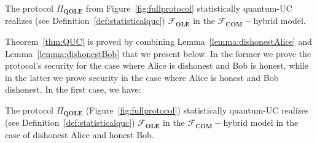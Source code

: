 \begin{theorem}

The protocol $\Pi_{\textbf{QOLE}}$ from Figure~\ref{fig:fullprotocol} statistically quantum-UC realizes  (see Definition~\ref{def:statisticalquc}) $\mathcal{F}_{\textbf{OLE}}$ in the $\mathcal{F}_{\textbf{COM}}-$hybrid model.
\label{thm:QUC}
\end{theorem}

Theorem~\ref{thm:QUC} is proved by combining Lemma~\ref{lemma:dishonestAlice} and Lemma~\ref{lemma:dishonestBob} that we present below.  In the former we prove the protocol's security for the case where Alice is dishonest and Bob is honest, while in the latter we prove security in the case where Alice is honest and Bob dishonest. 
In the first case, we have:

\begin{lemma}
The protocol $\Pi_{\textbf{QOLE}}$ (Figure~\ref{fig:fullprotocol}) statistically quantum-UC realizes  (see Definition~\ref{def:statisticalquc}) $\mathcal{F}_{\textbf{OLE}}$ in the $\mathcal{F}_{\textbf{COM}}-$hybrid model in the case of dishonest Alice and honest Bob.
\label{lemma:dishonestAlice}
\end{lemma}

